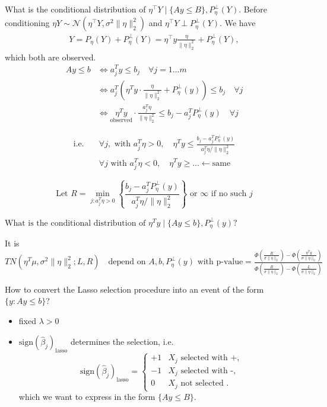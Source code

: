 What is the conditional distribution of $\eta^\top Y \mid \{Ay\leq B\}, P_\eta^\perp(Y)$. Before conditioning $\eta Y \sim \mathcal{N}(\eta^\top Y, \sigma^2 \lVert\eta\rVert_2^2)$ and $\eta^\top Y \perp P_\eta^\perp(Y)$. We have
\begin{align*}
    Y = P_\eta(Y) + P_\eta^\perp(Y) = \eta^\top y \frac{\eta}{\lVert \eta\rVert_2^2}  + P_\eta^\perp(Y),
\end{align*}
which both are observed.
\begin{align*}
Ay \le b &\iff a_j^T y \le b_j \quad \forall j=1\dots m \\
&\iff a_j^T \left( \eta^T y \cdot \frac{\eta}{\|\eta\|_2^2} + P_\eta^\perp(y) \right) \le b_j \quad \forall j \\
&\iff \underset{\text{observed}}{\eta^T y} \cdot \frac{a_j^T \eta}{\|\eta\|_2^2} \le b_j - a_j^T P_\eta^\perp(y) \quad \forall j
\end{align*}

\begin{align*}
\text{i.e.} \quad &\forall j, \text{ with } a_j^T \eta > 0, \quad \eta^T y \le \frac{b_j - a_j^T P_\eta^\perp(y)}{a_j^T \eta / \|\eta\|_2^2} \\
&\forall j \text{ with } a_j^T \eta < 0, \quad \eta^T y \ge \dots \leftarrow \text{same}
\end{align*}

\[
\text{Let } R = \min_{j : a_j^T \eta > 0} \left\{ \frac{b_j - a_j^T P_\eta^\perp(y)}{a_j^T \eta / \|\eta\|_2^2} \right\} \text{ or } \infty \text{ if no such } j
\]

$\text{What is the conditional distribution of } \eta^T y \mid \{Ay \le b\}, P_\eta^\perp(y)?$

It is $TN(\eta^T \mu, \sigma^2 \|\eta\|_2^2; L, R) \quad \text{depend on } A, b, P_\eta^\perp(y) \text{ with p-value} = \frac{\Phi\left(\frac{R}{\sigma\|\eta\|_2}\right) - \Phi\left(\frac{\eta^T y}{\sigma\|\eta\|_2}\right)}{\Phi\left(\frac{R}{\sigma\|\eta\|_2}\right) - \Phi\left(\frac{L}{\sigma\|\eta\|_2}\right)}$

How to convert the Lasso selection procedure into an event of the form $\{y\colon Ay\leq b\}$?
\begin{itemize}
    \item fixed $\lambda > 0$
    \item $\text{sign}(\hat{\beta}_j)_{\text{lasso}}$ determines the selection, i.e. \begin{equation}
        \text{sign}(\hat{\beta}_j)_{\text{lasso}} =
    \begin{cases}
        +1 & X_j \text{ selected with +,}\\
        -1 & X_j \text{ selected with -,}\\
        0 & X_j \text{ not selected }.
    \end{cases}
    \end{equation} which we want to express in the form $\{Ay\leq B\}$.
\end{itemize}


